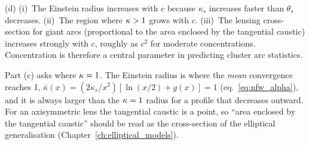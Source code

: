 (d) (i)~The Einstein radius increases with $c$ because
$\kappa_s$ increases faster than $\theta_s$ decreases.
(ii)~The region where $\kappa > 1$ grows with $c$.
(iii)~The lensing cross-section for giant arcs (proportional to the
area enclosed by the tangential caustic) increases strongly with $c$,
roughly as $c^2$ for moderate concentrations.  Concentration is
therefore a central parameter in predicting cluster arc
statistics. \checkmark

\begin{annotation}[Einstein radius is $\bar\kappa = 1$, not $\kappab = 1$]
Part (c) asks where $\kappab = 1$.  The Einstein radius is where the
\emph{mean} convergence reaches 1, $\bar\kappa(x) = (2\kappa_s/x^2)[\ln(x/2)+g(x)] = 1$
(eq.~\eqref{eq:nfw_alpha}), and it is always larger than the $\kappab = 1$
radius for a profile that decreases outward.  For an axisymmetric lens the
tangential caustic is a point, so ``area enclosed by the tangential caustic''
should be read as the cross-section of the elliptical generalisation
(Chapter~\ref{ch:elliptical_models}).
\end{annotation}
